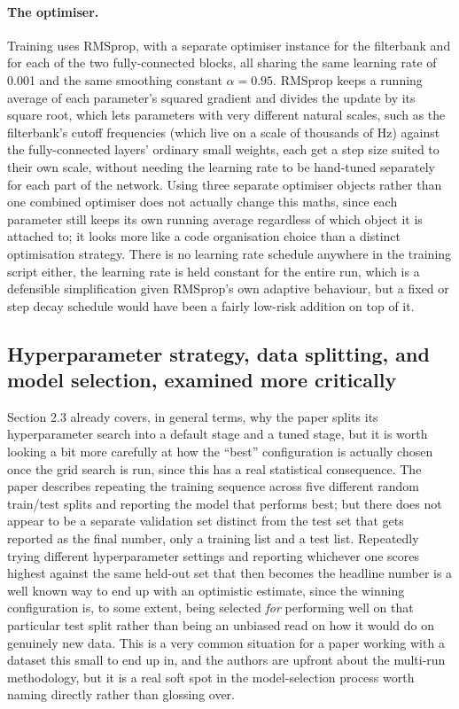 \documentclass[11pt]{article}
\begin{document}
\paragraph{The optimiser.} Training uses RMSprop, with a separate optimiser instance for the filterbank and for each of the two fully-connected blocks, all sharing the same learning rate of 0.001 and the same smoothing constant $\alpha = 0.95$. RMSprop keeps a running average of each parameter's squared gradient and divides the update by its square root, which lets parameters with very different natural scales, such as the filterbank's cutoff frequencies (which live on a scale of thousands of Hz) against the fully-connected layers' ordinary small weights, each get a step size suited to their own scale, without needing the learning rate to be hand-tuned separately for each part of the network. Using three separate optimiser objects rather than one combined optimiser does not actually change this maths, since each parameter still keeps its own running average regardless of which object it is attached to; it looks more like a code organisation choice than a distinct optimisation strategy. There is no learning rate schedule anywhere in the training script either, the learning rate is held constant for the entire run, which is a defensible simplification given RMSprop's own adaptive behaviour, but a fixed or step decay schedule would have been a fairly low-risk addition on top of it.

\subsection{Hyperparameter strategy, data splitting, and model selection, examined more critically}

Section 2.3 already covers, in general terms, why the paper splits its hyperparameter search into a default stage and a tuned stage, but it is worth looking a bit more carefully at how the ``best'' configuration is actually chosen once the grid search is run, since this has a real statistical consequence. The paper describes repeating the training sequence across five different random train/test splits and reporting the model that performs best; but there does not appear to be a separate validation set distinct from the test set that gets reported as the final number, only a training list and a test list. Repeatedly trying different hyperparameter settings and reporting whichever one scores highest against the same held-out set that then becomes the headline number is a well known way to end up with an optimistic estimate, since the winning configuration is, to some extent, being selected \emph{for} performing well on that particular test split rather than being an unbiased read on how it would do on genuinely new data. This is a very common situation for a paper working with a dataset this small to end up in, and the authors are upfront about the multi-run methodology, but it is a real soft spot in the model-selection process worth naming directly rather than glossing over.
\end{document}
